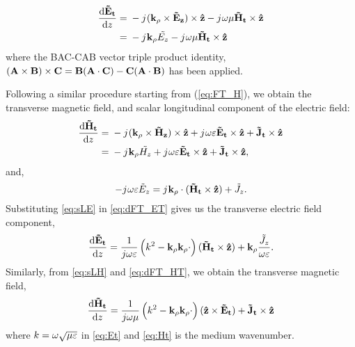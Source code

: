 \documentclass[11pt]{article}
\begin{document}
%
\begin{equation}
  \begin{split}
    \dv{\v{\ti{E}_t}}{z} ={}& -\j (\v{k_{\p}} \x \v{\ti{E}_z}) \x \v{\^{z}}
    -\j \O \u \v{\ti{H}_t} \x \v{\^{z}}\\
    ={}& -\j \v{k_{\p}} \ti{{E}_z} -\j \O \u \v{\ti{H}_t} \x \v{\^{z}}
  \end{split}
  \label{eq:dFT_ET}%
\end{equation}
%
where the BAC-CAB vector triple product identity, $(\mathbf{A} \times \mathbf{B})\times\mathbf{C} = \mathbf{B}(\mathbf{A} \cdot \mathbf{C}) - \mathbf{C}(\mathbf{A} \cdot \mathbf{B})$ has been applied.

Following a similar procedure starting from (\ref{eq:FT_H}), we obtain the transverse magnetic field, and scalar longitudinal component of the electric field:
%
\begin{equation}
  \begin{split}
    \dv{\v{\ti{H}_t}}{z} ={}& -\j (\v{k_{\p}} \x \v{\ti{H}_z}) \x \v{\^{z}}
    + \j \O \E \v{\ti{E}_t} \x \v{\^{z}} +
    \v{\ti{J}_t} \x \v{\^{z}} \\
    ={}& -\j \v{k_{\p}} \ti{{H}_z} + \j \O \E \v{\ti{E}_t} \x \v{\^{z}}  +
    \v{\ti{J}_t} \x \v{\^{z}},
  \end{split}
  \label{eq:dFT_HT}%
\end{equation}
%
and,
\begin{equation}
  -j\mkern1mu \omega \varepsilon \tilde{E}_z =
  j\mkern1mu \mathbf{k_{\rho}} \cdot (\mathbf{\tilde{H}_t} \times \mathbf{\hat{z}}) + {\tilde{J}_z}.
  \label{eq:sLE}
\end{equation}
%
Substituting \eqref{eq:sLE} in \eqref{eq:dFT_ET} gives us the transverse electric field component,
%
\begin{equation}
  \dv{\mathbf{\tilde{E}_t}}{z} =
  \frac{1}{j \omega \varepsilon} \left( k^2 - \mathbf{k_{\rho}}\mathbf{k_{\rho}} \cdot \right) (\mathbf{\tilde{H}_t} \times \mathbf{\hat{z}}) + \mathbf{k_{\rho}} \frac{\tilde{J}_z}{\omega \varepsilon}.
  \label{eq:Et}
\end{equation}
%
Similarly, from \eqref{eq:sLH} and \eqref{eq:dFT_HT}, we obtain the transverse magnetic field,
%
\begin{equation}
  \dv{\mathbf{\tilde{H}_t}}{z} =
  \frac{1}{j \omega \mu} \left( k^2 - \mathbf{k_{\rho}}\mathbf{k_{\rho}} \cdot \right) (\mathbf{\hat{z}} \times \mathbf{\tilde{E}_t}) + \mathbf{\tilde{J}_t}
  \times \mathbf{\hat{z}}
  \label{eq:Ht}
\end{equation}
%
where $k = \omega \sqrt{\mu \varepsilon}$ in \eqref{eq:Et} and \eqref{eq:Ht} is the medium wavenumber.
\end{document}
